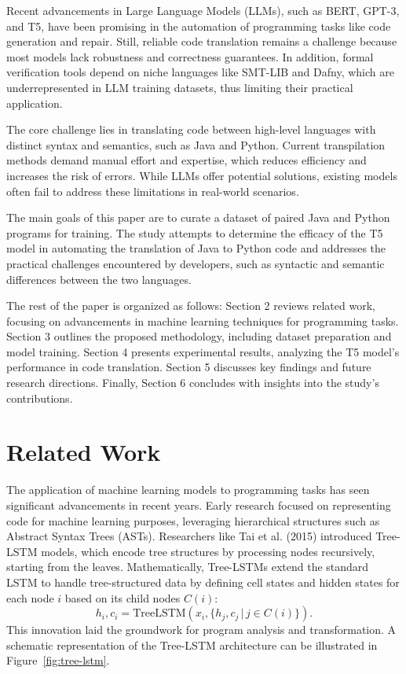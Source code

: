 \documentclass{dhbenelux}
\begin{document}
Recent advancements in Large Language Models (LLMs), such as BERT, GPT-3, and T5, have been promising in the automation of programming tasks like code generation and repair. Still, reliable code translation remains a challenge because most models lack robustness and correctness guarantees. In addition, formal verification tools depend on niche languages like SMT-LIB and Dafny, which are underrepresented in LLM training datasets, thus limiting their practical application.

The core challenge lies in translating code between high-level languages with distinct syntax and semantics, such as Java and Python. Current transpilation methods demand manual effort and expertise, which reduces efficiency and increases the risk of errors. While LLMs offer potential solutions, existing models often fail to address these limitations in real-world scenarios.

The main goals of this paper are to curate a dataset of paired Java and Python programs for training. The study attempts to determine the efficacy of the T5 model in automating the translation of Java to Python code and addresses the practical challenges encountered by developers, such as syntactic and semantic differences between the two languages.

The rest of the paper is organized as follows: Section 2 reviews related work, focusing on advancements in machine learning techniques for programming tasks. Section 3 outlines the proposed methodology, including dataset preparation and model training. Section 4 presents experimental results, analyzing the T5 model's performance in code translation. Section 5 discusses key findings and future research directions. Finally, Section 6 concludes with insights into the study's contributions.



\section{Related Work}

The application of machine learning models to programming tasks has seen significant advancements in recent years. Early research focused on representing code for machine learning purposes, leveraging hierarchical structures such as Abstract Syntax Trees (ASTs). Researchers like Tai et al. (2015) introduced Tree-LSTM models, which encode tree structures by processing nodes recursively, starting from the leaves. Mathematically, Tree-LSTMs extend the standard LSTM to handle tree-structured data by defining cell states and hidden states for each node \( i \) based on its child nodes \( C(i) \):
\[
h_i, c_i = \text{TreeLSTM}(x_i, \{h_{j}, c_{j} \,|\, j \in C(i)\}).
\]
This innovation laid the groundwork for program analysis and transformation. A schematic representation of the Tree-LSTM architecture can be illustrated in Figure~\ref{fig:tree-lstm}.
\end{document}

